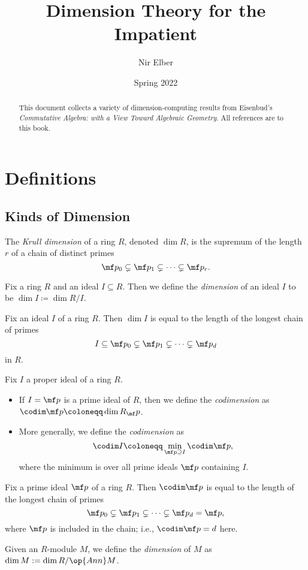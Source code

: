 \documentclass{article}
\title{Dimension Theory for the Impatient}
\author{Nir Elber}
\date{Spring 2022}
\begin{document}
\maketitle

\begin{abstract}
	\noindent This document collects a variety of dimension-computing results from Eisenbud's \textit{Commutative Algebra: with a View Toward Algebraic Geometry}. All references are to this book.
\end{abstract}

\setcounter{secnumdepth}{4}
\setcounter{tocdepth}{4}
\tableofcontents

\newpage

\section{Definitions}

\subsection{Kinds of Dimension}
\begin{defi*}[Dimension] \label{def:krulldim}
	The \textit{Krull dimension} of a ring $R$, denoted $\dim R$, is the supremum of the length $r$ of a chain of distinct primes
	\[\mf p_0\subsetneq\mf p_1\subsetneq\cdots\subsetneq\mf p_r.\]
\end{defi*}
\begin{definition*}
	Fix a ring $R$ and an ideal $I\subseteq R$. Then we define the \textit{dimension} of an ideal $I$ to be $\dim I\coloneqq\dim R/I$.
\end{definition*}
\begin{lemma*} \label{lem:dimisascend}
	Fix an ideal $I$ of a ring $R$. Then $\dim I$ is equal to the length of the longest chain of primes
	\[I\subseteq\mf p_0\subsetneq\mf p_1\subsetneq\cdots\subsetneq\mf p_d\]
	in $R$.
\end{lemma*}
\begin{definition*}[Codimension]
	Fix $I$ a proper ideal of a ring $R$.
	\begin{itemize}
		\item If $I=\mf p$ is a prime ideal of $R$, then we define the \textit{codimension} as $\codim\mf p\coloneqq\dim R_\mf p$.
		\item More generally, we define the \textit{codimension} as
		\[\codim I\coloneqq\min_{\mf p\supseteq I}\codim\mf p,\]
		where the minimum is over all prime ideals $\mf p$ containing $I$.
	\end{itemize}
\end{definition*}
\begin{lemma*} \label{lem:codimisdescend}
	Fix a prime ideal $\mf p$ of a ring $R$. Then $\codim\mf p$ is equal to the length of the longest chain of primes
	\[\mf p_0\subsetneq\mf p_1\subsetneq\cdots\subsetneq\mf p_d=\mf p,\]
	where $\mf p$ is included in the chain; i.e., $\codim\mf p=d$ here.
\end{lemma*}
\begin{definition*}
	Given an $R$-module $M$, we define the \textit{dimension} of $M$ as $\dim M:=\dim R/\op{Ann}M$.
\end{definition*}
\end{document}
